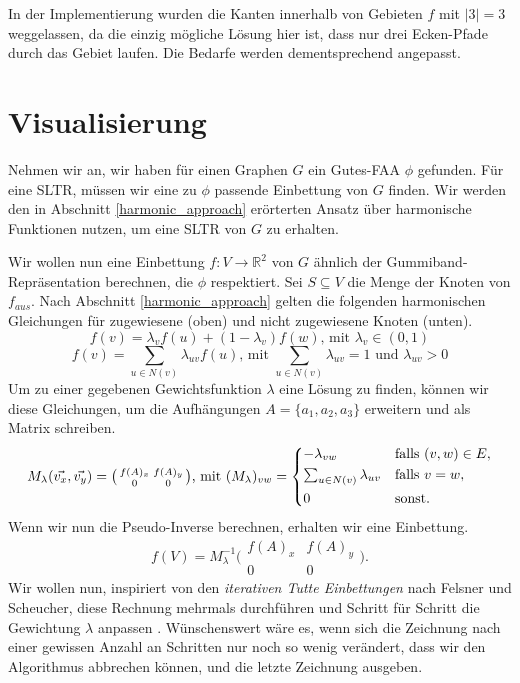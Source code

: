 \begin{remark}
In der Implementierung wurden die Kanten innerhalb von Gebieten $f$ mit $|3|=3$ weggelassen, da die einzig mögliche Lösung hier ist, dass nur drei Ecken-Pfade durch das Gebiet laufen. Die Bedarfe werden dementsprechend angepasst.
\end{remark}

\section{Visualisierung}

Nehmen wir an, wir haben für einen Graphen $G$ ein Gutes-FAA $\phi$ gefunden. Für eine SLTR, müssen wir eine zu $\phi$ passende Einbettung von $G$ finden. Wir werden den in Abschnitt \ref{harmonic_approach} erörterten Ansatz über harmonische Funktionen nutzen, um eine SLTR von $G$ zu erhalten.

Wir wollen nun eine Einbettung $f:V\to \mathbb{R}^2$ von $G$ ähnlich der Gummiband-Repräsentation berechnen, die $\phi$ respektiert. Sei $S \subseteq V$ die Menge der Knoten von $f_{aus}$. Nach Abschnitt \ref{harmonic_approach} gelten die folgenden harmonischen Gleichungen für zugewiesene (oben) und nicht zugewiesene Knoten (unten).
$$ f(v) = \lambda_v f(u) + (1-\lambda_v)f(w) \text{, mit } \lambda_v \in (0,1) $$
$$ f(v) = \sum_{u \in N(v)} \lambda_{uv} f(u) \text{, mit }  \sum_{u \in N(v)}\lambda_{uv} = 1 \text{ und } \lambda_{uv} > 0 $$
Um zu einer gegebenen Gewichtsfunktion $\lambda$ eine Lösung zu finden, können wir diese Gleichungen, um die Aufhängungen $A = \{a_1,a_2,a_3\}$ erweitern und als Matrix schreiben.
\[ M_{\lambda}(\vec{v_x},\vec{v_y}) = \big( \begin{smallmatrix}f(A)_x&f(A)_y\\ 0&0\end{smallmatrix} \big) \text{, mit } (M_{\lambda})_{vw} =
	\begin{dcases}
	-\lambda_{vw} & \text{falls } (v,w) \in E, \\
	\textstyle\sum_{u \in N(v)} \lambda_{uv} & \text{falls } v = w, \\
	0 & \text{sonst.} \\
	\end{dcases}
\]
Wenn wir nun die Pseudo-Inverse berechnen, erhalten wir eine Einbettung.
$$f(V) = M_{\lambda}^{-1}\big( \begin{smallmatrix}f(A)_x&f(A)_y\\ 0&0\end{smallmatrix} \big).$$
Wir wollen nun, inspiriert von den \textit{iterativen Tutte Einbettungen} nach Felsner und Scheucher, diese Rechnung mehrmals durchführen und Schritt für Schritt die Gewichtung $\lambda$ anpassen \cite{fs17}. Wünschenswert wäre es, wenn sich die Zeichnung nach einer gewissen Anzahl an Schritten nur noch so wenig verändert, dass wir den Algorithmus abbrechen können, und die letzte Zeichnung ausgeben.

